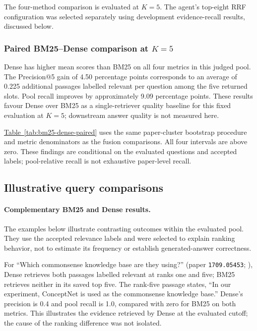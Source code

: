 The four-method comparison is evaluated at $K=5$. The agent's top-eight RRF configuration was selected separately using development evidence-recall results, discussed below.

\subsubsection{Paired BM25--Dense comparison at \texorpdfstring{$K=5$}{K=5}}

Dense has higher mean scores than BM25 on all four metrics in this judged pool. The Precision@5 gain of 4.50 percentage points corresponds to an average of 0.225 additional passages labelled relevant per question among the five returned slots. Pool recall improves by approximately 9.09 percentage points. These results favour Dense over BM25 as a single-retriever quality baseline for this fixed evaluation at $K=5$; downstream answer quality is not measured here.

\hyperref[tab:bm25-dense-paired]{Table~\ref*{tab:bm25-dense-paired}} uses the same paper-cluster bootstrap procedure and metric denominators as the fusion comparisons. All four intervals are above zero. These findings are conditional on the evaluated questions and accepted labels; pool-relative recall is not exhaustive paper-level recall.

\subsection{Illustrative query comparisons}
\paragraph{Complementary BM25 and Dense results.}
The examples below illustrate contrasting outcomes within the evaluated pool. They use the accepted relevance labels and were selected to explain ranking behavior, not to estimate its frequency or establish generated-answer correctness.

For ``Which commonsense knowledge base are they using?'' (paper \texttt{1709.05453}; \citep{young2017dialog}), Dense retrieves both passages labelled relevant at ranks one and five; BM25 retrieves neither in its saved top five. The rank-five passage states, ``In our experiment, ConceptNet is used as the commonsense knowledge base.'' Dense's precision is 0.4 and pool recall is 1.0, compared with zero for BM25 on both metrics. This illustrates the evidence retrieved by Dense at the evaluated cutoff; the cause of the ranking difference was not isolated.

